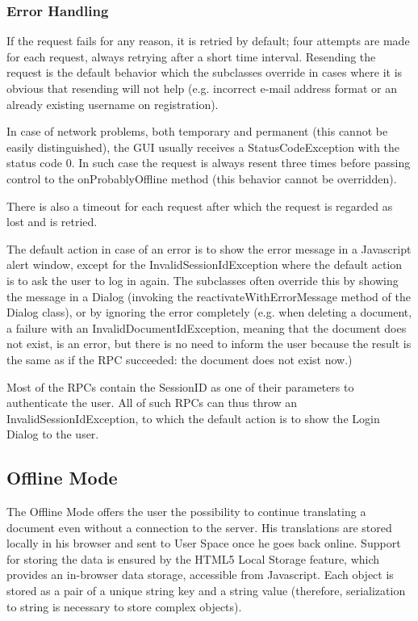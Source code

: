 \subsubsection{Error Handling}

If the request fails for any reason, it is retried by default; four attempts are made for each request, always retrying after a short time interval.
Resending the request is the default behavior which the subclasses override in cases where it is obvious that resending will not help (e.g. incorrect e-mail address format or an already existing username on registration).

In case of network problems, both temporary and permanent (this cannot be easily distinguished), the GUI usually receives a StatusCodeException with the status code 0. In such case the request is always resent three times before passing control to the onProbablyOffline method (this behavior cannot be overridden).

There is also a timeout for each request after which the request is regarded as lost and is retried.

The default action in case of an error is to show the error message in a Javascript alert window, except for the InvalidSessionIdException where the default action is to ask the user to log in again.
The subclasses often override this by showing the message in a Dialog (invoking the reactivateWithErrorMessage method of the Dialog class), or by ignoring the error completely (e.g. when deleting a document, a failure with an InvalidDocumentIdException, meaning that the document does not exist, is an error, but there is no need to inform the user because the result is the same as if the RPC succeeded: the document does not exist now.)

Most of the RPCs contain the SessionID as one of their parameters to authenticate the user. All of such RPCs can thus throw an InvalidSessionIdException, to which the default action is to show the Login Dialog to the user.

\subsection{Offline Mode}


The Offline Mode offers the user the possibility to continue translating a document even without a connection to the server. His translations are stored locally in his browser and sent to User Space once he goes back online.
Support for storing the data is ensured by the HTML5 Local Storage feature, which provides an in-browser data storage, accessible from Javascript.
Each object is stored as a pair of a unique string key and a string value (therefore, serialization to string is necessary to store complex objects).

